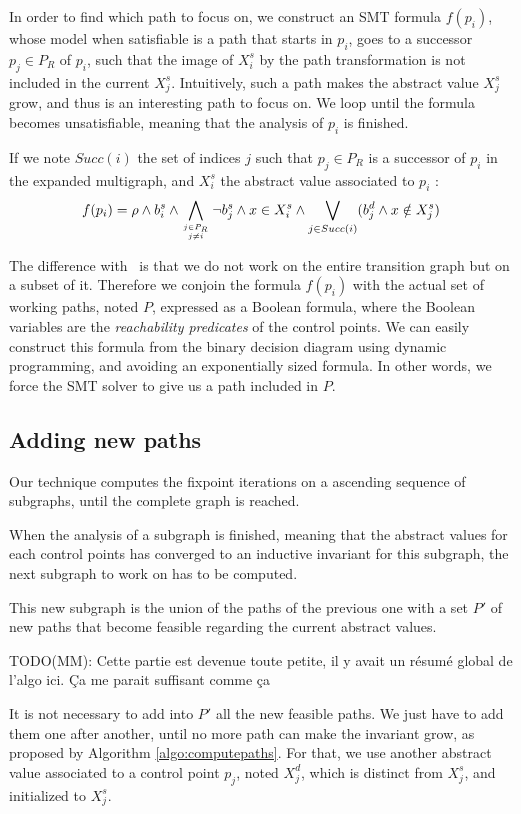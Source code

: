 \documentclass[preprint]{sigplanconf}
\newcommand{\MM}[1]{{\color{blue} TODO(MM): #1}}
\begin{document}
In order to find which path to focus on, we construct an SMT formula $f(p_i)$, whose
model when satisfiable is a path that starts in $p_i$, goes to a successor $p_j
\in P_R$ of $p_i$, such that the image of $X_{i}^s$ by the path transformation
is not included in the current $X_{j}^s$.
Intuitively, such a path makes the abstract value $X_{j}^s$ grow, and thus is
an interesting path to focus on. We loop until the formula becomes unsatisfiable,
meaning that the analysis of $p_i$ is finished.

If we note $Succ(i)$ the set of indices $j$ such that $p_j \in P_R$ is a
successor of $p_i$ in the expanded multigraph, and $X_i^s$ the abstract value
associated to $p_i$ :
$$f(p_i) = \rho \wedge b_i^s \wedge 
\displaystyle\bigwedge_{j \in P_R \atop j \neq i} \neg
b_j^s \wedge x \in X_i^s \wedge \displaystyle\bigvee_{j \in Succ(i)} (b_j^d \wedge
x \notin X_j^s)$$

The difference with~\citet{Monniaux_Gonnord_SAS11} is that we do not
work on the entire transition graph but on a subset of it. Therefore we
conjoin the formula $f(p_i)$ with the actual set of working paths,
noted $P$, expressed as a Boolean formula, where the Boolean variables are the
\emph{reachability predicates} of the control points. We can easily construct
this formula from the binary decision diagram using dynamic programming, and
avoiding an exponentially sized formula. In other words, we force the SMT solver
to give us a path included in $P$.


\subsection{Adding new paths}
\label{subsec:addingpaths}

Our technique computes the fixpoint iterations on a ascending sequence of
subgraphs, until the complete graph is reached.

When the analysis of a subgraph is finished, meaning that the abstract values
for each control points has converged to an inductive invariant for this subgraph,
the next subgraph to work on has to be computed.

This new subgraph is the union of the paths of the previous one with a set
$P'$ of new paths that become feasible regarding the current abstract values.

\MM{Cette partie est devenue toute petite, il y avait un résumé global
  de l'algo ici. Ça me parait suffisant comme ça}

It is not necessary to add into $P'$ all the new feasible paths. We just have
to add them one after another, until no more path can make the invariant grow,
as proposed by Algorithm \ref{algo:computepaths}. For that, we use another
abstract value associated to a control point $p_j$, noted $X_j^d$, which is
distinct from $X_j^s$, and initialized to $X_j^s$.
\end{document}
